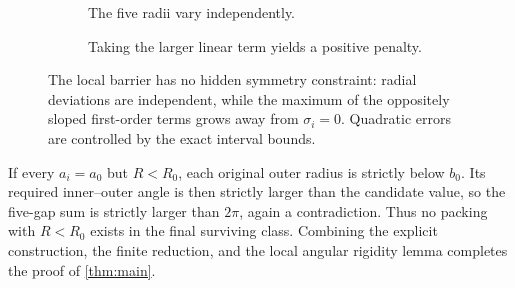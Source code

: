 \documentclass[11pt]{article}
\theoremstyle{definition}
\begin{document}
\begin{figure}[htbp]
\centering
\begin{subfigure}[t]{.47\textwidth}
\centering
{}
\caption{The five radii vary independently.}
\end{subfigure}\hfill
\begin{subfigure}[t]{.47\textwidth}
\centering
{}
\caption{Taking the larger linear term yields a positive penalty.}
\end{subfigure}
\caption{The local barrier has no hidden symmetry constraint: radial deviations are independent, while the maximum of the oppositely sloped first-order terms grows away from $\sigma_i=0$. Quadratic errors are controlled by the exact interval bounds.}
\label{fig:local-penalty}
\end{figure}

If every $a_i=a_0$ but $R<R_0$, each original outer radius is strictly below $b_0$. Its required inner--outer angle is then strictly larger than the candidate value, so the five-gap sum is strictly larger than $2\pi$, again a contradiction. Thus no packing with $R<R_0$ exists in the final surviving class. Combining the explicit construction, the finite reduction, and the local angular rigidity lemma completes the proof of \cref{thm:main}.
\end{document}
